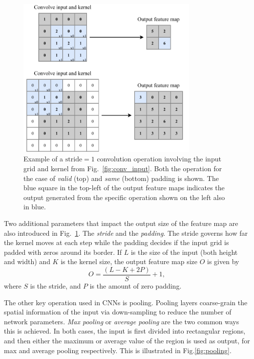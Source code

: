 \begin{figure} %
    \includegraphics[width=0.8\textwidth]{diagrams/6-cvn/conv_operation.pdf}
    \caption[Example of convolutional operation.]
    {Example of a $\mathrm{stride}=1$ convolution operation involving the input grid and kernel
        from Fig.~\ref{fig:conv_input}. Both the operation for the case of \emph{valid} (top) and
        \emph{same} (bottom) padding is shown. The blue square in the top-left of the output
        feature maps indicates the output generated from the specific operation shown on the left
        also in blue.}
    \label{fig:conv_operation}
\end{figure}

Two additional parameters that impact the output size of the feature map are also introduced in
Fig.~\ref{fig:conv_operation}. The \emph{stride} and the \emph{padding}. The stride governs how
far the kernel moves at each step while the padding decides if the input grid is padded with zeros
around its border. If $L$ is the size of the input (both height and width) and $K$ is the kernel
size, the output feature map size $O$ is given by
\begin{equation}
    O=\frac{(L-K+2P)}{S}+1,
    \label{eq:conv_size}
\end{equation}
where $S$ is the stride, and $P$ is the amount of zero padding.

The other key operation used in CNNs is pooling. Pooling layers coarse-grain the spatial
information of the input via down-sampling to reduce the number of network parameters. \emph{Max
    pooling} or \emph{average pooling} are the two common ways this is achieved. In both cases, the
input is first divided into rectangular regions, and then either the maximum or average value of
the region is used as output, for max and average pooling respectively. This is illustrated in
Fig.\ref{fig:pooling}.

